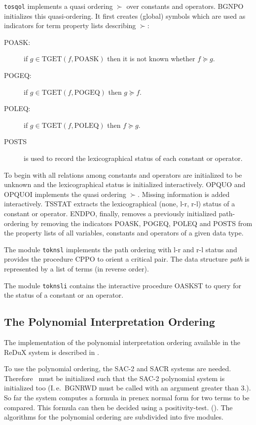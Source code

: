 {\tt tosqol} implements a quasi ordering $\succ$ over constants and operators.
BGNPO  initializes this quasi-ordering.
It first creates (global) symbols which are used as indicators for 
term property lists describing $\succ$:
\begin{description}
 \item[POASK:] if \( g \in \mbox{TGET}(f,\mbox{POASK}) \) 
               then it is not known whether \( f \succeq g \).
 \item[POGEQ:] if  \( g \in \mbox{TGET}(f,\mbox{POGEQ}) \) 
                then \( g \succeq f \).
 \item[POLEQ:] if  \( g \in \mbox{TGET}(f,\mbox{POLEQ}) \) 
                then \( f \succeq g \).
 \item[POSTS] is used to record the lexicographical status of each
              constant or operator.
\end{description}
To begin with all relations among constants and operators are initialized to
be unknown  and the lexicographical status is initialized interactively.
OPQUO and OPQUOI implements the quasi ordering $\succ$. Missing information
is added interactively.
TSSTAT extracts the lexicographical (none, l-r, r-l) status of a constant
or operator.
ENDPO, finally, removes a previously initialized path-ordering by
removing the indicators POASK, POGEQ, POLEQ and POSTS from the property lists
of all variables, constants and operators of a given data type.

The module {\tt toknsl} implements the path ordering with l-r and r-l status
and provides the procedure CPPO to orient a critical pair.
The data structure {\em path} is represented by a list of terms 
(in reverse order).

The module {\tt toknsli} contains the interactive procedure OASKST to query
for the status of a constant or an operator.

\subsection{The Polynomial Interpretation Ordering}

The implementation of the polynomial interpretation ordering 
available in the ReDuX system is described in \cite{BenCherifaLescanne:87}.

To use the polynomial ordering, the SAC-2 and SACR systems are needed.
Therefore \redux\ must be initialized such that the SAC-2 polynomial system
is initialized too 
(I.\,e.\ BGNRWD must be called with an  argument greater than 3.).
So far the system computes a formula in prenex normal form 
for two terms to be compared.
This formula can then be decided using a positivity-test.
(\cite{BenCherifaLescanne:87}).
The algorithms for the polynomial ordering are subdivided into five modules.

